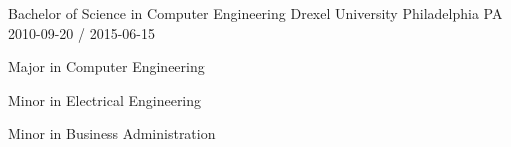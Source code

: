 \documentclass[11pt, a4paper]{awesomecv}
\begin{document}
\begin{cventries}
 
  \cventry
    {Bachelor of Science in Computer Engineering}
    {Drexel University}
    {Philadelphia PA}
    {2010-09-20 / 2015-06-15}
    {
          \begin{cvitems}
                    \item{Major in Computer Engineering}
                    \item{Minor in Electrical Engineering}
                    \item{Minor in Business Administration}
          \end{cvitems}
    }
 
\end{cventries}

\end{document}

